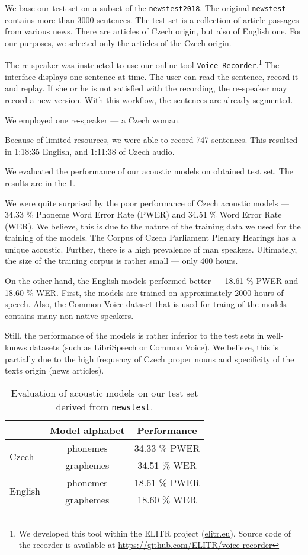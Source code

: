 We base our test set on a subset of the \texttt{newstest2018}. The original \texttt{news\-test} contains more than 3000 sentences. The test set is a collection of article passages from various news. There are articles of Czech origin, but also of English one. For our purposes, we selected only the articles of the Czech origin. 

The re-speaker was instructed to use our online tool \texttt{Voice Recorder}.\footnote{We developed this tool within the ELITR project (\url{elitr.eu}). Source code of the recorder is available at \url{https://github.com/ELITR/voice-recorder}} The interface displays one sentence at time. The user can read the sentence, record it and replay. If she or he is not satisfied with the recording, the re-speaker may record a new version. With this workflow, the sentences are already segmented.

We employed one re-speaker --- a Czech woman.

Because of limited resources, we were able to record 747 sentences. This resulted in 1:18:35 English, and 1:11:38 of Czech audio.

We evaluated the performance of our acoustic models on obtained test set. The results are in the \cref{tab:acoustic_eval}. 

We were quite surprised by the poor performance of Czech acoustic models --- 34.33 \% Phoneme Word Error Rate (PWER) and 34.51 \% Word Error Rate (WER). We believe, this is due to the nature of the training data we used for the training of the models. The Corpus of Czech Parliament Plenary Hearings has a unique acoustic. Further, there is a high prevalence of man speakers. Ultimately, the size of the training corpus is rather small --- only 400 hours.

On the other hand, the English models performed better --- 18.61 \% PWER and 18.60 \% WER. First, the models are trained on approximately 2000 hours of speech. Also, the Common Voice dataset that is used for traing of the models contains many non-native speakers.

Still, the performance of the models is rather inferior to the test sets in well-knows datasets (such as LibriSpeech or Common Voice). We believe, this is partially due to the high frequency of Czech proper nouns and specificity of the texts origin (news articles). 

\begin{table}[t]
	\centering
	\begin{tabular}{lc|c}
		& Model alphabet & Performance   \\ \hline
		\multirow{2}{*}{Czech}   & phonemes       & 34.33 \% PWER \\
		& graphemes      & 34.51 \% WER  \\ \hline
		\multirow{2}{*}{English} & phonemes       & 18.61 \% PWER \\
		& graphemes      & 18.60 \% WER 
	\end{tabular}
	\caption[Acoustic models performance on \texttt{read-newstest}]{Evaluation of acoustic models on our test set derived from \texttt{news\-test}.}
	\label{tab:acoustic_eval}
\end{table}

